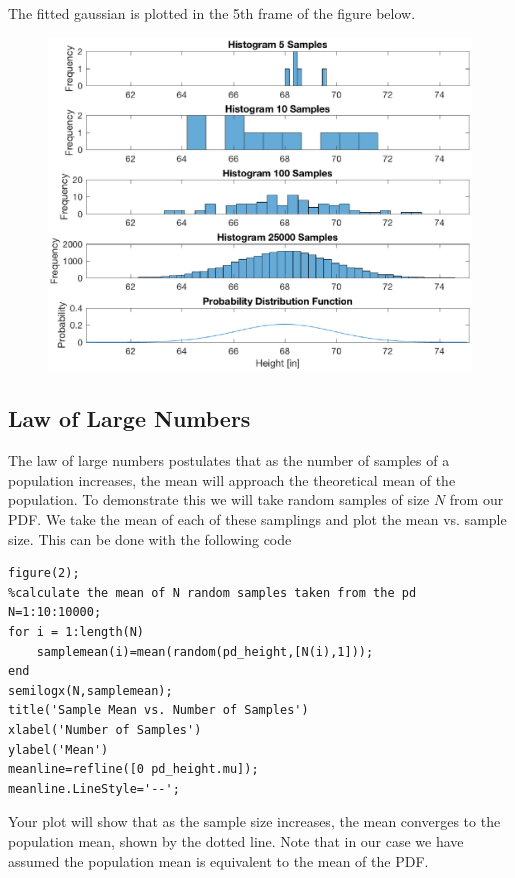 \documentclass[12pt]{article}
\begin{document}
The fitted gaussian is plotted in the 5th frame of the figure below. 

\begin{figure}[H]
\centering
\includegraphics[width=0.75\linewidth]{heightHistograms.eps}
\end{figure}

\subsection{Law of Large Numbers}

The law of large numbers postulates that as the number of samples of a population increases, the mean will approach the theoretical mean of the population. To demonstrate this we will take random samples of size $N$ from our PDF. We take the mean of each of these samplings and plot the mean vs. sample size. This can be done with the following code

\begin{lstlisting}[frame=single]
figure(2);
%calculate the mean of N random samples taken from the pd
N=1:10:10000;
for i = 1:length(N)
    samplemean(i)=mean(random(pd_height,[N(i),1]));
end
semilogx(N,samplemean);
title('Sample Mean vs. Number of Samples')
xlabel('Number of Samples')
ylabel('Mean')
meanline=refline([0 pd_height.mu]);
meanline.LineStyle='--';
\end{lstlisting}

Your plot will show that as the sample size increases, the mean converges to the population mean, shown by the dotted line. Note that in our case we have assumed the population mean is equivalent to the mean of the PDF.
\end{document}
